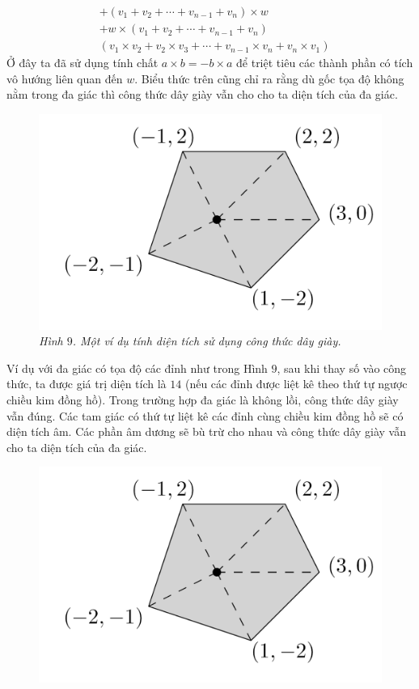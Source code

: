 \begin{multicols}{2}
\begin{align*}
		&+(v_1+v_2+\cdots+v_{n-1}+v_n) \times w \\
		&+ w \times (v_1+v_2+\cdots +v_{n-1}+v_n)\\
		&(v_1 \times v_2+v_2 \times v_3+\cdots + v_{n-1} \times v_n + v_n \times v_1)
	\end{align*}
	Ở đây ta đã sử dụng tính chất $a \times b=-b \times a$ để triệt tiêu các thành phần có tích vô hướng liên quan đến $w$.
	\vskip 0.1cm
	Biểu thức trên cũng chỉ ra rằng dù gốc tọa độ không nằm trong đa giác thì công thức dây giày vẫn cho cho ta diện tích của đa giác.
	\begin{figure}[H]
		\vspace*{-5pt}
		\centering
		\captionsetup{labelformat= empty, justification=centering}
		\includegraphics[width= 1\linewidth]{13}
		\caption{\small\textit{\color{toanhocdoisong}Hình $9$. Một ví dụ tính diện tích sử dụng công thức dây giày.}}
		\vspace*{-10pt}
	\end{figure}
	Ví dụ với đa giác có tọa độ các đỉnh như trong Hình $9$, sau khi thay số vào công thức, ta được giá trị diện tích là $14$ (nếu các đỉnh được liệt kê theo thứ tự ngược chiều kim đồng hồ).
	\vskip 0.1cm
	Trong trường hợp đa giác là không lồi, công thức dây giày vẫn đúng. Các tam giác có thứ tự liệt kê các đỉnh cùng chiều kim đồng hồ sẽ có diện tích âm. Các phần âm dương sẽ bù trừ cho nhau và công thức dây giày vẫn cho ta diện tích của đa giác.
	\begin{figure}[H]
		\vspace*{-5pt}
		\centering
		\captionsetup{labelformat= empty, justification=centering}
		\includegraphics[width= 1\linewidth]{13}

\end{figure}
\end{multicols}
